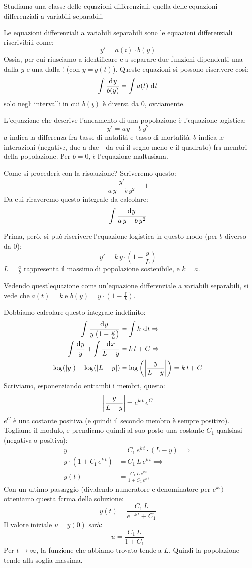 Studiamo una classe delle equazioni differenziali, quella delle equazioni differenziali a variabili separabili.

Le equazioni differenziali a variabili separabili sono le equazioni differenziali riscrivibili come:
\[
y' = a(t) \cdot b(y)
\]
Ossia, per cui riusciamo a identificare e a separare due funzioni dipendenti una dalla $y$ e una dalla $t$ (con $y = y(t)$). Queste equazioni si possono riscrivere cos\`i:
\[
\int \frac{\diff y}{b(y)} = \int a(t) \dx[t]
\]
solo negli intervalli in cui $b(y)$ \`e diversa da 0, ovviamente.
\begin{exmp}
L'equazione che descrive l'andamento di una popolazione \`e l'equazione logistica:
\[
y' = a \, y - b \, y^2
\]
$a$ indica la differenza fra tasso di natalit\`a e tasso di mortalit\`a. $b$ indica le interazioni (negative, due a due - da cui il segno meno e il quadrato) fra membri della popolazione. Per $b = 0$, \`e l'equazione maltusiana. 

Come si proceder\`a con la risoluzione? Scriveremo questo:
\[
\frac{y'}{a \, y - b \, y^2} = 1
\]
Da cui ricaveremo questo integrale da calcolare:
\[
\int \frac{\diff y}{a \, y - b \, y^2}
\]

Prima, per\`o, si pu\`o riscrivere l'equazione logistica in questo modo (per $b$ diverso da 0):
\[
y' = k \, y \cdot \left( 1 - \frac{y}{L} \right)
\]
$L = \frac{a}{b}$ rappresenta il massimo di popolazione sostenibile, e $k = a$.

Vedendo quest'equazione come un'equazione differenziale a variabili separabili, si vede che $a(t) = k$ e $b(y) = y \cdot \left( 1 - \frac{y}{L} \right)$.

Dobbiamo calcolare questo integrale indefinito:
\begin{align*}
\int \frac{\diff y}{y \, \left( 1 - \frac{y}{L} \right)} &= \int k \dx[t] \implies \\
\int \frac{\diff y}{y} + \int \frac{\diff x}{L - y} &= k \, t + C \implies \\
\abslog{y} - \abslog{L - y} &= \abslog{\frac{y}{L - y}} = k \, t + C 
\end{align*}
Scriviamo, esponenziando entrambi i membri, questo:
\[
\left\lvert{\frac{y}{L - y}}\right\rvert = e^{k \, t} \, e^C
\]
$e^C$ \`e una costante positiva (e quindi il secondo membro \`e sempre positivo). Togliamo il modulo, e prendiamo quindi al suo posto una costante $C_1$ qualsiasi (negativa o positiva):
\begin{align*}
y &= C_1 \, e^{k \, t} \cdot (L - y) \implies \\
y \cdot (1 + C_1 \, e^{k \, t}) &= C_1 \, L \, e^{k \, t} \implies \\
y(t) &= \frac{C_1 \, L \, e^{k \, t}}{1 + C_1 \, e^{k \, t}}
\end{align*}
Con un ultimo passaggio (dividendo numeratore e denominatore per $e^{k \, t})$ otteniamo questa forma della soluzione:
\[
y(t) = \frac{C_1 \, L}{e^{- k \, t} + C_1}
\]
Il valore iniziale $u = y(0)$ sar\`a:
\[
u = \frac{C_1 \, L}{1 + C_1}
\]
Per $t \to \infty$, la funzione che abbiamo trovato tende a $L$. Quindi la popolazione tende alla soglia massima.


\end{exmp}

